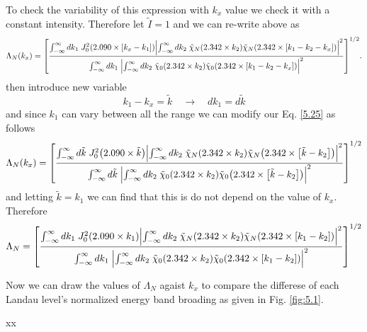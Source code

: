\noindent
To check the variability of this expression with $k_x$ value we check it with a constant intensity. Therefore let $\tilde{I}=1$ and we can re-write above as
\begin{equation} \label{5.25}
    \Lambda_N (k_x) =
    \qty[
    \frac
    {\int_{-\infty}^{\infty} d {k}_1 \;
    J_0^2\qty(2.090\times[{k}_x - {k}_1])
    \qty|
    \int_{-\infty}^{\infty} d{k}_2 \;
    \tilde{\chi}_{N}\qty(2.342 \times k_2)
    \tilde{\chi}_{N}\qty(2.342 \times \qty[{k}_1 - {k}_2 - {k}_x])|^2}
    {\int_{-\infty}^{\infty} d {k}_1 \;
    \qty|
    \int_{-\infty}^{\infty} d{k}_2 \;
    \tilde{\chi}_{0}\qty(2.342 \times k_2)
    \tilde{\chi}_{0}\qty(2.342 \times \qty[{k}_1 - {k}_2 - {k}_x])|^2}
    ]^{1/2}.
\end{equation}
then introduce new variable
\begin{equation} \label{5.26}
  k_1 - k_x = \tilde{k} \quad \longrightarrow \quad dk_1 = d\tilde{k}
\end{equation}
and since $k_1$ can vary between all the range we can modify our Eq. \eqref{5.25} as follows
\begin{equation} \label{5.27}
    \Lambda_N (k_x) =
    \qty[
    \frac
    {\int_{-\infty}^{\infty} d \tilde{k} \;
    J_0^2\qty(2.090\times \tilde{k})
    \qty|
    \int_{-\infty}^{\infty} d{k}_2 \;
    \tilde{\chi}_{N}\qty(2.342 \times k_2)
    \tilde{\chi}_{N}\qty(2.342 \times \qty[\tilde{k}- {k}_2])|^2}
    {\int_{-\infty}^{\infty} d \tilde{k} \;
    \qty|
    \int_{-\infty}^{\infty} d{k}_2 \;
    \tilde{\chi}_{0}\qty(2.342 \times k_2)
    \tilde{\chi}_{0}\qty(2.342 \times \qty[\tilde{k} - {k}_2])|^2}
    ]^{1/2}
\end{equation}
and letting $\tilde{k} = k_1$ we can find that this is do not depend on the value of $k_x$. Therefore
\begin{equation} \label{5.27}
    \Lambda_N =
    \qty[
    \frac
    {\int_{-\infty}^{\infty} d k_1 \;
    J_0^2\qty(2.090\times k_1)
    \qty|
    \int_{-\infty}^{\infty} d{k}_2 \;
    \tilde{\chi}_{N}\qty(2.342 \times k_2)
    \tilde{\chi}_{N}\qty(2.342 \times \qty[k_1 - {k}_2])|^2}
    {\int_{-\infty}^{\infty} d k_1\;
    \qty|
    \int_{-\infty}^{\infty} d{k}_2 \;
    \tilde{\chi}_{0}\qty(2.342 \times k_2)
    \tilde{\chi}_{0}\qty(2.342 \times \qty[k_1 - {k}_2])|^2}
    ]^{1/2}
\end{equation}

\noindent
Now we can draw the values of $\Lambda_N$ agaist $k_x$ to compare the differese of each Landau level's normalized energy band broading as given in Fig. \ref{fig:5.1}.









xx
